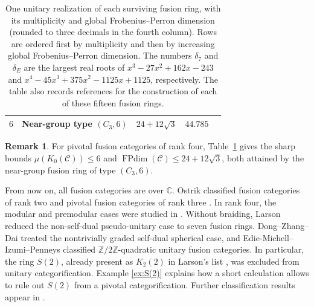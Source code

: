 \documentclass[11pt]{amsart}
\theoremstyle{definition}
\newtheorem{remark}[theorem]{Remark}
\DeclareMathOperator{\FPdim}{FPdim}
\newcommand{\C}{\mathbb C}
\newcommand{\Z}{\mathbb Z}
\numberwithin{equation}{section}
\begin{document}
\begin{table}[ht]
\begin{tabular}{@{}clcrl@{}}
$6$ & Near-group type $(C_3,6)$ & $24+12\sqrt{3}$ & $44.785$ & \cite[Theorem 10.19]{IzumiNear} \\
\bottomrule
\end{tabular}
\caption{One unitary realization of each surviving fusion ring, with its
multiplicity and global Frobenius--Perron dimension
(rounded to three decimals in the fourth column). Rows are ordered first
by multiplicity and then by increasing global Frobenius--Perron dimension.
The numbers $\delta_7$ and $\delta_E$ are the largest real roots of
$x^3-27x^2+162x-243$ and
$x^4-45x^3+375x^2-1125x+1125$, respectively. 
The table also records references for the construction of each of these fifteen fusion rings.}
\label{tab:models}
\end{table}

\begin{remark}\label{rem:sharp}
For pivotal fusion categories of rank four, Table~\ref{tab:models} gives the sharp bounds $\mu(K_0(\mathcal C))\leq6$ and $\FPdim(\mathcal C)\leq24+12\sqrt3$, both attained by the near-group fusion ring of type $(C_3,6)$.
\end{remark}

From now on, all fusion categories are over $\C$. 
Ostrik classified fusion categories of rank two \cite{OstrikRank2}
and pivotal fusion categories of rank three \cite{OstrikRank3}.
In rank four, the modular and premodular cases were studied in
\cite{RSW,HongRowell,Bruillard4}. Without braiding, Larson
\cite{Larson} reduced the non-self-dual pseudo-unitary case to seven
fusion rings. Dong--Zhang--Dai \cite{DongZhangDai} treated the
nontrivially graded self-dual spherical case, and
Edie-Michell--Izumi--Penneys \cite{EIP} classified
$\Z/2\Z$-quadratic unitary fusion categories. In particular, the ring
$S(2)$, already present as $K_2(2)$ in Larson's list
\cite[Theorem~1.1(6)]{Larson}, was excluded from unitary categorification. 
Example \ref{ex:S(2)} explains how a short calculation allows to rule out $S(2)$ from a pivotal categorification. 
Further classification results appear in \cite{DongChenWang,DongSelfDual4}. 
\end{document}
